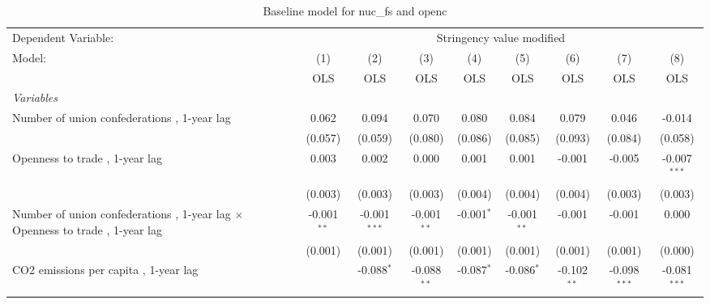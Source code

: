 
\begin{table}[htbp]
   \caption{Baseline model for nuc\_fs and openc}
   \centering
   \begin{tabular}{lcccccccc}
      \toprule
      Dependent Variable: & \multicolumn{8}{c}{Stringency value modified}\\
      Model:                                                                               & (1)           & (2)            & (3)           & (4)           & (5)           & (6)           & (7)            & (8)\\  
                                                                                           &  OLS          & OLS            & OLS           & OLS           & OLS           & OLS           & OLS            & OLS\\  
      \midrule
      \emph{Variables}\\
      Number of union confederations , 1-year lag                                          & 0.062         & 0.094          & 0.070         & 0.080         & 0.084         & 0.079         & 0.046          & -0.014\\   
                                                                                           & (0.057)       & (0.059)        & (0.080)       & (0.086)       & (0.085)       & (0.093)       & (0.084)        & (0.058)\\   
      Openness to trade , 1-year lag                                                       & 0.003         & 0.002          & 0.000         & 0.001         & 0.001         & -0.001        & -0.005         & -0.007$^{***}$\\   
                                                                                           & (0.003)       & (0.003)        & (0.003)       & (0.004)       & (0.004)       & (0.004)       & (0.003)        & (0.003)\\   
      Number of union confederations , 1-year lag $\times$ Openness to trade , 1-year lag  & -0.001$^{**}$ & -0.001$^{***}$ & -0.001$^{**}$ & -0.001$^{*}$  & -0.001$^{**}$ & -0.001        & -0.001         & 0.000\\   
                                                                                           & (0.001)       & (0.001)        & (0.001)       & (0.001)       & (0.001)       & (0.001)       & (0.001)        & (0.000)\\   
      CO2 emissions per capita , 1-year lag                                                &               & -0.088$^{*}$   & -0.088$^{**}$ & -0.087$^{*}$  & -0.086$^{*}$  & -0.102$^{**}$ & -0.098$^{***}$ & -0.081$^{***}$\\   

\end{tabular}
\end{table}

